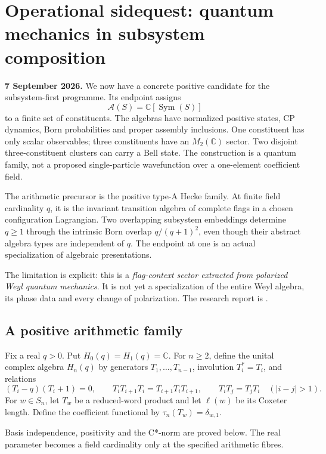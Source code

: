\clearpage
\section{Operational sidequest: quantum mechanics in subsystem composition}
\label{sec:f1-operational}

\textbf{7 September 2026.} We now have a concrete positive candidate for
the subsystem-first programme. Its endpoint assigns
\[
\mathcal A(S)=\mathbb C[\operatorname{Sym}(S)]
\]
to a finite set of constituents. The algebras have normalized positive
states, CP dynamics, Born probabilities and proper assembly inclusions.
One constituent has only scalar observables; three constituents have an
$M_2(\mathbb C)$ sector. Two disjoint three-constituent clusters can carry
a Bell state. The construction is a quantum family, not a proposed
single-particle wavefunction over a one-element coefficient field.

The arithmetic precursor is the positive type-A Hecke family. At finite
field cardinality $q$, it is the invariant transition algebra of complete
flags in a chosen configuration Lagrangian. Two overlapping subsystem
embeddings determine $q\geq1$ through the intrinsic Born overlap
$q/(q+1)^2$, even though their abstract algebra types are independent of $q$.
The endpoint at one is an actual specialization of algebraic presentations.

The limitation is explicit: this is a \emph{flag-context sector extracted
from polarized Weyl quantum mechanics}. It is not yet a specialization of
the entire Weyl algebra, its phase data and every change of polarization.
The research report is .

\subsection{A positive arithmetic family}

\begin{definition}
Fix a real $q>0$. Put $H_0(q)=H_1(q)=\mathbb C$. For $n\geq2$, define
the unital complex algebra $H_n(q)$ by generators $T_1,\ldots,T_{n-1}$,
involution $T_i^*=T_i$, and relations
\[
(T_i-q)(T_i+1)=0,\qquad
T_iT_{i+1}T_i=T_{i+1}T_iT_{i+1},\qquad
T_iT_j=T_jT_i\quad(|i-j|>1).
\]
For $w\in S_n$, let $T_w$ be a reduced-word product and let $\ell(w)$
be its Coxeter length. Define the coefficient functional by
$\tau_n(T_w)=\delta_{w,1}$.
\end{definition}
\begin{scope}Basis independence, positivity and the C*-norm are proved
below. The real parameter becomes a field cardinality only at the
specified arithmetic fibres.\end{scope}


